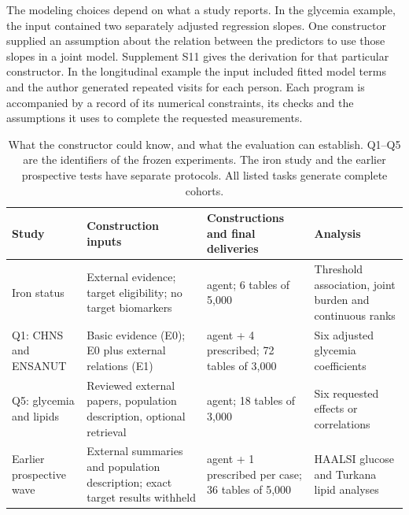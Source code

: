 \documentclass[sigconf,review]{acmart}
\begin{document}
The modeling choices depend on what a study reports. In the glycemia example, the input contained two separately adjusted regression slopes. One constructor supplied an assumption about the relation between the predictors to use those slopes in a joint model. Supplement S11 gives the derivation for that particular constructor. In the longitudinal example the input included fitted model terms and the author generated repeated visits for each person. Each program is accompanied by a record of its numerical constraints, its checks and the assumptions it uses to complete the requested measurements.


\begin{table}[tp]

\caption{What the constructor could know, and what the evaluation can establish. Q1–\allowbreak{}Q5 are the identifiers of the frozen experiments. The iron study and the earlier prospective tests have separate protocols. All listed tasks generate complete cohorts.}

\label{tab:2}

\centering\small

\renewcommand{\arraystretch}{1.12}

\begin{tabularx}{\textwidth}{@{}>{\raggedright\arraybackslash}X>{\raggedright\arraybackslash}X>{\raggedright\arraybackslash}X>{\raggedright\arraybackslash}X@{}}

\toprule

Study & Construction inputs & Constructions and final deliveries & Analysis \\

\midrule

Iron status & External evidence; target eligibility; no target biomarkers & 2 agent; 6 tables of 5,000 & Threshold association, joint burden and continuous ranks \\

Q1: CHNS and ENSANUT & Basic evidence (E0); E0 plus external relations (E1) & 20 agent + 4 prescribed; 72 tables of 3,000 & Six adjusted glycemia coefficients \\

Q5: glycemia and lipids & Reviewed external papers, population description, optional retrieval & 6 agent; 18 tables of 3,000 & Six requested effects or correlations \\

Earlier prospective wave & External summaries and population description; exact target results withheld & 5 agent + 1 prescribed per case; 36 tables of 5,000 & HAALSI glucose and Turkana lipid analyses \\


\end{tabularx}
\end{table}
\end{document}
